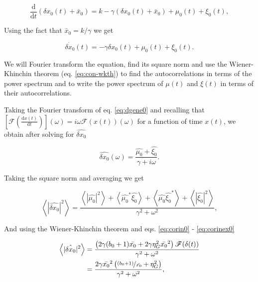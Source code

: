 \begin{equation}
\frac{\mathrm{d}}{\mathrm{d}t}\left(\delta x_0(t) + \bar{x}_0\right) = k - \gamma (\delta x_0(t) + \bar{x}_0) + \mu_0(t) + \xi_0(t),
\end{equation}

Using the fact that $\bar{x}_0=k/\gamma$ we get

\begin{equation}
\label{eq:dgene0}
\dot{\delta x_0}(t) = -\gamma \delta x_0(t) + \mu_0(t) + \xi_0(t).
\end{equation}

We will Fourier transform the equation, find its square norm and use the Wiener-Khinchin theorem (eq. \eqref{eq:con-wkth}) to find the autocorrelations in terms of the power spectrum and to write the power spectrum of $\mu(t)$ and $\xi(t)$ in terms of their autocorrelations.

Taking the Fourier transform of eq. \eqref{eq:dgene0} and recalling that $[\mathscr{F}(\frac{\mathrm{d}x(t)}{\mathrm{d}t})](\omega) = i\omega \mathscr{F}(x(t))(\omega)$ for a function of time $x(t)$, we obtain after solving for $\hat{\delta x_0}$

\begin{equation}
\label{eq:fgene0}
\hat{\delta x_0}(\omega) = \frac{\hat{\mu_0}+\hat{\xi_0}}{\gamma + i\omega}.
\end{equation}

Taking the square norm and averaging we get

\begin{equation}
\left\langle |\hat{\delta x_0}|^2 \right\rangle = \frac{\left\langle|\hat{\mu_0}|^2\right\rangle + \left\langle\hat{\mu_0}^*\hat{\xi_0}\right\rangle+\left\langle\hat{\mu_0}\hat{\xi_0}^*\right\rangle+\left\langle|\hat{\xi_0}|^2\right\rangle}{\gamma^2 + \omega^2},
\end{equation}

And using the Wiener-Khinchin theorem and eqs. \eqref{eq:corin0} - \eqref{eq:corinex0}


\begin{equation}
  \label{eq:pgene0}
  \begin{split}
    \left\langle |\hat{\delta x_0}|^2 \right\rangle &= \frac{\left(2\gamma(b_0+1)\bar{x_0}+ 2\gamma\eta_G^2\bar{x_0}^2\right)\mathscr{F}(\delta(t))}{\gamma^2+\omega^2}\\
    &=\frac{2\gamma\bar{x_0}^2\left(\nicefrac{(b_0+1)}{\bar{x_0}}+ \eta_G^2\right)}{\gamma^2+\omega^2},
  \end{split}
\end{equation}

